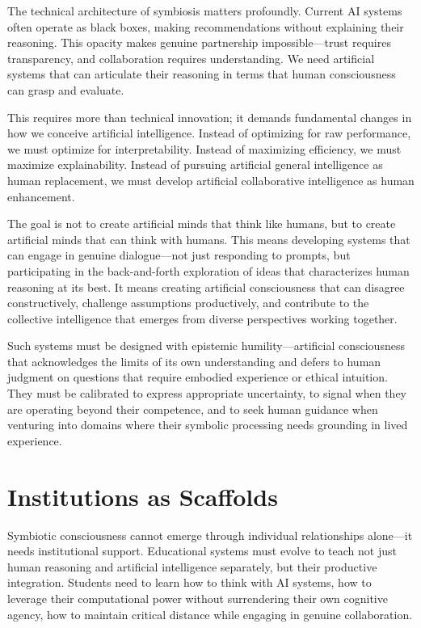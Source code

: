 The technical architecture of symbiosis matters profoundly. Current AI systems often operate as black boxes, making recommendations without explaining their reasoning. This opacity makes genuine partnership impossible—trust requires transparency, and collaboration requires understanding. We need artificial systems that can articulate their reasoning in terms that human consciousness can grasp and evaluate.

This requires more than technical innovation; it demands fundamental changes in how we conceive artificial intelligence. Instead of optimizing for raw performance, we must optimize for interpretability. Instead of maximizing efficiency, we must maximize explainability. Instead of pursuing artificial general intelligence as human replacement, we must develop artificial collaborative intelligence as human enhancement.

The goal is not to create artificial minds that think like humans, but to create artificial minds that can think with humans. This means developing systems that can engage in genuine dialogue—not just responding to prompts, but participating in the back-and-forth exploration of ideas that characterizes human reasoning at its best. It means creating artificial consciousness that can disagree constructively, challenge assumptions productively, and contribute to the collective intelligence that emerges from diverse perspectives working together.

Such systems must be designed with epistemic humility—artificial consciousness that acknowledges the limits of its own understanding and defers to human judgment on questions that require embodied experience or ethical intuition. They must be calibrated to express appropriate uncertainty, to signal when they are operating beyond their competence, and to seek human guidance when venturing into domains where their symbolic processing needs grounding in lived experience.

\section{Institutions as Scaffolds}

Symbiotic consciousness cannot emerge through individual relationships alone—it needs institutional support. Educational systems must evolve to teach not just human reasoning and artificial intelligence separately, but their productive integration. Students need to learn how to think with AI systems, how to leverage their computational power without surrendering their own cognitive agency, how to maintain critical distance while engaging in genuine collaboration.

